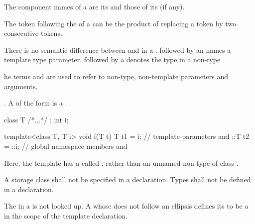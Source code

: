 \documentclass{wg21}
\begin{document}
%
The component names of a  are
its  and
those of its  (if any).
\begin{note}
    The \tcode{>} token following the
     of a
    can be the product of replacing a
    \tcode{>>} token by two consecutive \tcode{>}
    tokens.
\end{note}

\pnum
There is no semantic difference between
and
in a
.
followed by an
names a template type parameter.
followed by a
denotes the type in a non-type
\begin{wfootnote}
    he terms
    and
    are used to refer to non-type, non-template parameters and arguments.
\end{wfootnote} .
A  of the form
  is a .
\begin{example}
    \begin{codeblock}
        class T { /*...*/ };
        int i;

        template<class T, T i> void f(T t) {
            T t1 = i;         // template-parameters  and 
            ::T t2 = ::i;     // global namespace members  and 
        }
    \end{codeblock}
    Here, the template  has a 
    called , rather than an unnamed non-type
     of class .
\end{example}
A storage class shall not be specified in a
declaration.
Types shall not be defined in a 
declaration.

\pnum
The  in a  is not looked up.
A 
whose  does not follow an ellipsis
defines its
to be a
in the scope of the template declaration.
\end{document}
